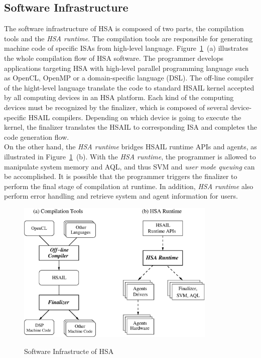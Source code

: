         \subsection{Software Infrastructure}
        The software infrastructure of HSA is composed of two parts, the compilation tools and the \textit{HSA runtime}.   
        The compilation tools are responsible for generating machine code of specific ISAs from high-level language.
        Figure~\ref{fig:swinf}~(a) illustrates the whole compilation flow of HSA software.
        The programmer develops applications targeting HSA with high-level parallel programming language such as OpenCL, OpenMP or a domain-specific language (DSL).
        The off-line compiler of the hight-level language translate the code to standard HSAIL kernel accepted by all computing devices in an HSA platform.
        Each kind of the computing devices must be recognized by the finalizer, 
        which is composed of several device-specific HSAIL compilers.
        Depending on which device is going to execute the kernel, 
        the finalizer translates the HSAIL to corresponding ISA and completes the code generation flow.
        \\\indent
        On the other hand, the \textit{HSA runtime} bridges HSAIL runtime APIs and agents, as illustrated in Figure~\ref{fig:swinf}~(b).
        With the \textit{HSA runtime}, the programmer is allowed to manipulate system memory and AQL, 
        and thus SVM and \textit{user mode queuing} can be accomplished.
        It is possible that the programmer triggers the finalizer to perform the final stage of compilation at runtime.
        In addition, \textit{HSA runtime} also perform error handling and retrieve system and agent information for users.
        \begin{figure}[!ht] 
            \caption{Software Infrastructe of HSA}
            \centering
            \includegraphics[width=0.85\textwidth]{./figs/swinf.eps}
            \label{fig:swinf}
        \end{figure}

